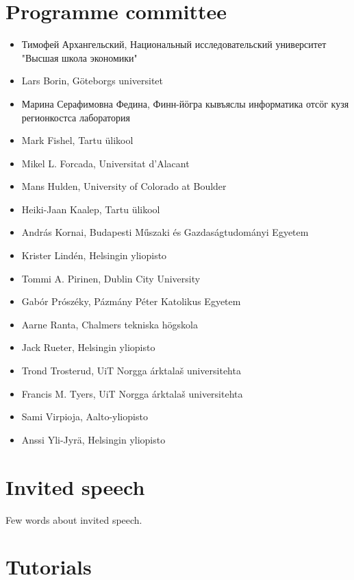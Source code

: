 \documentclass[b5paper]{book}
\begin{document}
\section*{Programme committee}

\begin{itemize}
    \item Тимофей Архангельский, Национальный исследовательский университет "Высшая школа экономики"
    \item Lars Borin, Göteborgs universitet
    \item Марина Серафимовна Федина, Финн-йӧгра кывъяслы информатика отсӧг кузя регионкостса лаборатория
    \item Mark Fishel, Tartu ülikool
    \item Mikel L. Forcada, Universitat d'Alacant
    \item Mans Hulden, University of Colorado at Boulder
    \item Heiki-Jaan Kaalep, Tartu ülikool
    \item András Kornai, Budapesti Műszaki és Gazdaságtudományi Egyetem
    \item Krister Lindén, Helsingin yliopisto
    \item Tommi A. Pirinen, Dublin City University
    \item Gabór Prószéky, Pázmány Péter Katolikus Egyetem
    \item Aarne Ranta, Chalmers tekniska högskola
    \item Jack Rueter, Helsingin yliopisto
    \item Trond Trosterud, UiT Norgga árktalaš universitehta
    \item Francis M. Tyers, UiT Norgga árktalaš universitehta
    \item Sami Virpioja, Aalto-yliopisto
    \item Anssi Yli-Jyrä, Helsingin yliopisto
\end{itemize}
\tableofcontents

\mainmatter

\section*{Invited speech}

Few words about invited speech.


\section*{Tutorials}
\end{document}
